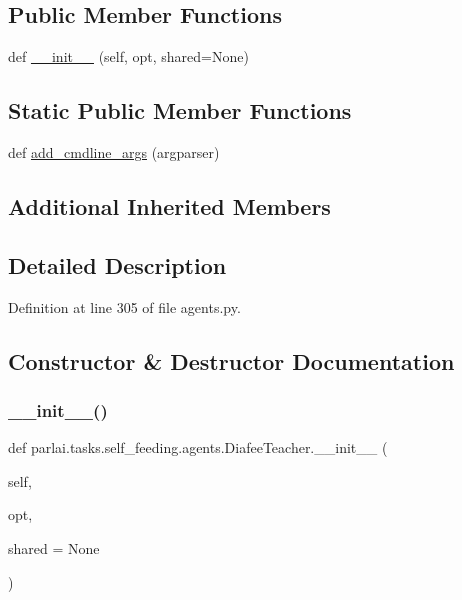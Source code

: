 \subsection*{Public Member Functions}
\begin{DoxyCompactItemize}
\item 
def \hyperlink{classparlai_1_1tasks_1_1self__feeding_1_1agents_1_1DiafeeTeacher_ab22b116d01e06c69aecafdad8b16ecb8}{\+\_\+\+\_\+init\+\_\+\+\_\+} (self, opt, shared=None)
\end{DoxyCompactItemize}
\subsection*{Static Public Member Functions}
\begin{DoxyCompactItemize}
\item 
def \hyperlink{classparlai_1_1tasks_1_1self__feeding_1_1agents_1_1DiafeeTeacher_aab781156a05d1046b153df4920d4ce6b}{add\+\_\+cmdline\+\_\+args} (argparser)
\end{DoxyCompactItemize}
\subsection*{Additional Inherited Members}


\subsection{Detailed Description}


Definition at line 305 of file agents.\+py.



\subsection{Constructor \& Destructor Documentation}
\mbox{\label{classparlai_1_1tasks_1_1self__feeding_1_1agents_1_1DiafeeTeacher_ab22b116d01e06c69aecafdad8b16ecb8}} 
\subsubsection{\texorpdfstring{\+\_\+\+\_\+init\+\_\+\+\_\+()}{\_\_init\_\_()}}
{\footnotesize\ttfamily def parlai.\+tasks.\+self\+\_\+feeding.\+agents.\+Diafee\+Teacher.\+\_\+\+\_\+init\+\_\+\+\_\+ (\begin{DoxyParamCaption}\item[{}]{self,  }\item[{}]{opt,  }\item[{}]{shared = {\ttfamily None} }\end{DoxyParamCaption})}



